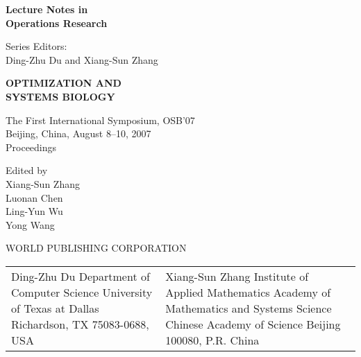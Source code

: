 
 \newpage
 \normalfont\normalsize

 \vspace*{10pt}

 \huge\bf\noindent
 Lecture Notes in \\[-10pt]
 Operations Research   \hfill   {\fontsize{50pt}{50pt} \quad}

 \vskip 10pt

 \Large\rm\noindent
 Series Editors: \\
 \quad Ding-Zhu Du and Xiang-Sun Zhang

 \vskip 30pt

 \Huge\bf\noindent
 OPTIMIZATION AND \\
 SYSTEMS BIOLOGY

 \vskip 10pt

 \large\rm\noindent
 The First International Symposium, OSB'07 \\
 Beijing, China, August 8--10, 2007 \\
 Proceedings

 \vskip 30pt

 \Large\rm\noindent
 Edited by \\[3pt]
 \quad  Xiang-Sun Zhang \\
 \quad  Luonan Chen \\
 \quad  Ling-Yun Wu \\
 \quad  Yong Wang

 \vfill

 \Large\rm\noindent
 WORLD PUBLISHING CORPORATION



 \newpage
 \normalfont\normalsize

 \vspace*{10pt}


 \vskip 10pt

 \noindent
 \begin{tabular}{@{}p{}p{}@{}}
  Ding-Zhu Du                                \newline
  Department of Computer Science             \newline
  University of Texas at Dallas              \newline
  Richardson, TX 75083-0688, USA
 &
  Xiang-Sun Zhang                            \newline
  Institute of Applied Mathematics           \newline
  Academy of Mathematics and Systems Science \newline
  Chinese Academy of Science                 \newline
  Beijing 100080, P.R. China
 \end{tabular}


